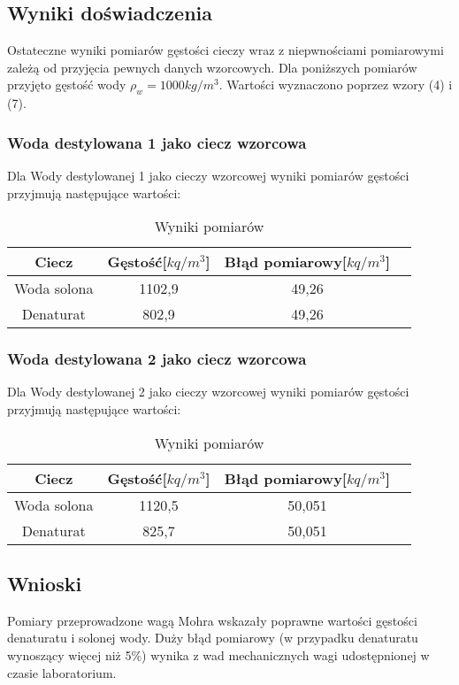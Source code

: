 \documentclass{article} %
\begin{document}
\subsection{Wyniki doświadczenia}

Ostateczne wyniki pomiarów gęstości cieczy wraz z niepwnościami pomiarowymi zależą od przyjęcia pewnych danych wzorcowych. Dla poniższych pomiarów przyjęto gęstość wody $\rho_w = 1000kg/m^3$. Wartości wyznaczono poprzez wzory (4) i (7).
\subsubsection{Woda destylowana 1 jako ciecz wzorcowa}
Dla Wody destylowanej 1 jako cieczy wzorcowej wyniki pomiarów gęstości przyjmują następujące wartości:
\begin{table}[h!]
\centering
\begin{tabular}{|c|c|c|c|}
\hline
\textbf{Ciecz} & \textbf{Gęstość[$kq/m^3$]} & \textbf{Błąd pomiarowy[$kq/m^3$]}\\
\hline
Woda solona & 1102,9 & 49,26\\
Denaturat & 802,9 & 49,26\\
\hline
\end{tabular}
\caption{Wyniki pomiarów}
\label{table:students}
\end{table}

\subsubsection{Woda destylowana 2 jako ciecz wzorcowa}
Dla Wody destylowanej 2 jako cieczy wzorcowej wyniki pomiarów gęstości przyjmują następujące wartości:
\begin{table}[h!]
\centering
\begin{tabular}{|c|c|c|c|}
\hline
\textbf{Ciecz} & \textbf{Gęstość[$kq/m^3$]} & \textbf{Błąd pomiarowy[$kq/m^3$]}\\
\hline
Woda solona & 1120,5 & 50,051\\
Denaturat & 825,7 & 50,051\\
\hline
\end{tabular}
\caption{Wyniki pomiarów}
\label{table:students}
\end{table}

\subsection{Wnioski}

Pomiary przeprowadzone wagą Mohra wskazały poprawne wartości gęstości denaturatu i solonej wody. Duży błąd pomiarowy (w przypadku denaturatu wynoszący więcej niż 5\%) wynika z wad mechanicznych wagi udostępnionej w czasie laboratorium.
\end{document}
